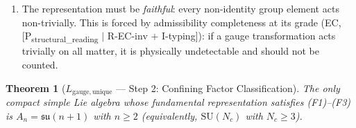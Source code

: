 \documentclass[11pt]{article}
\newtheorem{theorem}{Theorem}[section]
\theoremstyle{definition}
\newcommand{\SU}{\mathrm{SU}}
\begin{document}
\begin{enumerate}[label=(F\arabic*),nosep]
        itself is a \emph{selected filter premise} --- named here
        \textbf{F2-window} and carried in the imported-ingredient
        ledger: requiring the primitive antisymmetric invariant to sit
        at $3 \le k \le \mathrm{rank}(G)+1$ is a declared physical
        filter (few-body neutral composites of the carrier must exist
        at low rank), motivated by the composite-realizability reading
        of R1, and it is a premise of the classification, not a
        consequence of Lie theory.
  \item The representation must be \emph{faithful}: every non-identity
        group element acts non-trivially.  This is forced by
        admissibility completeness at its grade (EC,
        [P\textsubscript{structural\_reading} $\mid$ R-EC-inv $+$
        I-typing]): if a gauge transformation acts trivially on all
        matter, it is physically undetectable and should not be
        counted.
\end{enumerate}

\begin{theorem}[$L_{\mathrm{gauge,unique}}$ --- Step 2: Confining Factor Classification]\label{thm:R1_class}
The only compact simple Lie algebra whose fundamental representation
satisfies (F1)--(F3) is $A_n = \mathfrak{su}(n+1)$ with $n \ge 2$
(equivalently, $\SU(N_c)$ with $N_c \ge 3$).
\end{theorem}
\end{document}
